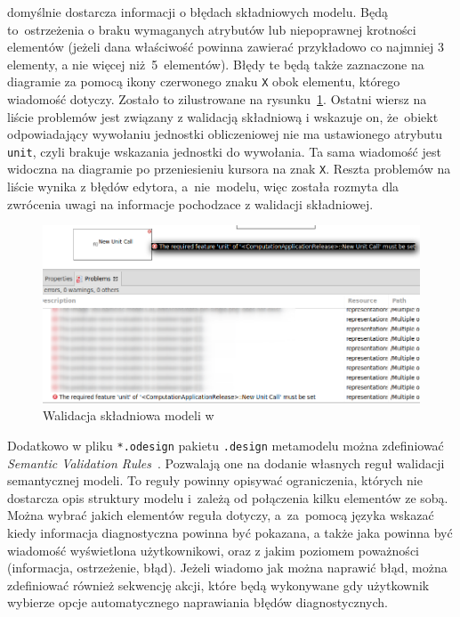 \SiriusDesktop{} domyślnie dostarcza informacji o błędach składniowych
modelu. Będą to~ostrzeżenia o braku wymaganych atrybutów lub niepoprawnej
krotności elementów (jeżeli dana właściwość powinna zawierać przykładowo co
najmniej 3 elementy, a nie więcej niż~5~elementów). Błędy te będą także
zaznaczone na diagramie za pomocą ikony czerwonego znaku \texttt{X} obok
elementu, którego wiadomość dotyczy. Zostało to zilustrowane na
rysunku~\ref{rys:sirius-desktop-syntax-validation}.
Ostatni wiersz na liście problemów jest związany z walidacją składniową i
wskazuje on, że~obiekt odpowiadający wywołaniu jednostki obliczeniowej nie ma
ustawionego atrybutu \texttt{unit}, czyli brakuje wskazania jednostki do
wywołania. Ta sama wiadomość jest widoczna na diagramie po przeniesieniu
kursora na znak \texttt{X}.
Reszta problemów na liście wynika z błędów edytora, a~nie~modelu, więc została
rozmyta dla zwrócenia uwagi na informacje pochodzace z walidacji składniowej.

\begin{figure}[!hb]
	\centering

	\includegraphics[width=0.95\linewidth]{./images/sirius-desktop-syntax-validation.png}
	\caption{Walidacja składniowa modeli w \SiriusDesktop{}}\label{rys:sirius-desktop-syntax-validation}
\end{figure}

Dodatkowo w pliku \texttt{*.odesign} pakietu \texttt{.design} metamodelu można
zdefiniować \emph{Semantic Validation
	Rules}~\cite{sirius-desktop-documentation-validation-rules}.
Pozwalają one na dodanie własnych reguł walidacji semantycznej modeli. To
reguły powinny opisywać ograniczenia, których nie dostarcza opis struktury
modelu i~zależą od połączenia kilku elementów ze sobą. Można
wybrać jakich elementów reguła dotyczy, a~za~pomocą języka \AQL{} wskazać
kiedy informacja diagnostyczna powinna być pokazana, a także jaka powinna być
wiadomość wyświetlona użytkownikowi, oraz z jakim poziomem poważności
(informacja, ostrzeżenie, błąd). Jeżeli wiadomo jak można naprawić błąd, można
zdefiniować również sekwencję akcji, które będą wykonywane gdy użytkownik
wybierze
opcje automatycznego naprawiania błędów diagnostycznych.

